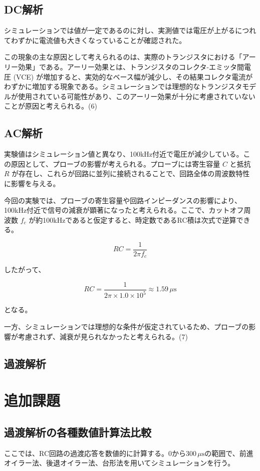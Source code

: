 \documentclass{jlreq}
\numberwithin{equation}{section}
\begin{document}
\subsection{DC解析}
シミュレーションでは値が一定であるのに対し、実測値では電圧が上がるにつれてわずかに電流値も大きくなっていることが確認された。

この現象の主な原因として考えられるのは、実際のトランジスタにおける「アーリー効果」である。アーリー効果とは、トランジスタのコレクタ-エミッタ間電圧 (VCE) が増加すると、実効的なベース幅が減少し、その結果コレクタ電流がわずかに増加する現象である。シミュレーションでは理想的なトランジスタモデルが使用されている可能性があり、このアーリー効果が十分に考慮されていないことが原因と考えられる。(6)

\subsection{AC解析}
実験値はシミュレーション値と異なり、100kHz付近で電圧が減少している。この原因として、プローブの影響が考えられる。プローブには寄生容量 \( C \) と抵抗 \( R \) が存在し、これらが回路に並列に接続されることで、回路全体の周波数特性に影響を与える。

今回の実験では、プローブの寄生容量や回路インピーダンスの影響により、100kHz付近で信号の減衰が顕著になったと考えられる。ここで、カットオフ周波数 \( f_c \) が約100kHzであると仮定すると、時定数であるRC積は次式で逆算できる。

\[
RC = \frac{1}{2\pi f_c}
\]

したがって、

\[
RC = \frac{1}{2\pi \times 1.0 \times 10^5} \approx 1.59\,\mu\mathrm{s}
\]

となる。

一方、シミュレーションでは理想的な条件が仮定されているため、プローブの影響が考慮されず、減衰が見られなかったと考えられる。(7)

\subsection{過渡解析}


\section{追加課題}

\subsection{過渡解析の各種数値計算法比較}
ここでは、RC回路の過渡応答を数値的に計算する。$0$から$300\,\mu\mathrm{s}$の範囲で、前進オイラー法、後退オイラー法、台形法を用いてシミュレーションを行う。
\end{document}
